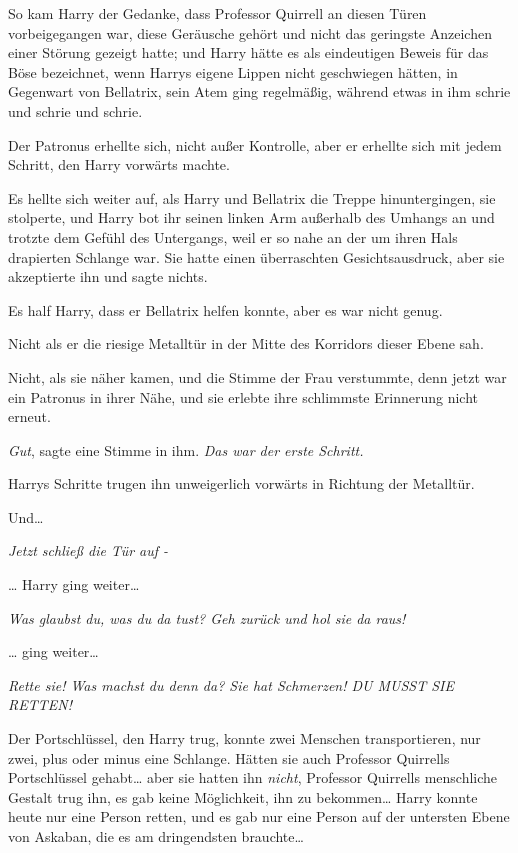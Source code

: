 {So kam Harry der Gedanke, dass Professor Quirrell an diesen Türen vorbeigegangen war, diese Geräusche gehört und nicht das geringste Anzeichen einer Störung gezeigt hatte; und Harry hätte es als eindeutigen Beweis für das Böse bezeichnet, wenn Harrys eigene Lippen nicht geschwiegen hätten, in Gegenwart von Bellatrix, sein Atem ging regelmäßig, während etwas in ihm schrie und schrie und schrie.

Der Patronus erhellte sich, nicht außer Kontrolle, aber er erhellte sich mit jedem Schritt, den Harry vorwärts machte.

Es hellte sich weiter auf, als Harry und Bellatrix die Treppe hinuntergingen, sie stolperte, und Harry bot ihr seinen linken Arm außerhalb des Umhangs an und trotzte dem Gefühl des Untergangs, weil er so nahe an der um ihren Hals drapierten Schlange war. Sie hatte einen überraschten Gesichtsausdruck, aber sie akzeptierte ihn und sagte nichts.

Es half Harry, dass er Bellatrix helfen konnte, aber es war nicht genug.

Nicht als er die riesige Metalltür in der Mitte des Korridors dieser Ebene sah.

Nicht, als sie näher kamen, und die Stimme der Frau verstummte, denn jetzt war ein Patronus in ihrer Nähe, und sie erlebte ihre schlimmste Erinnerung nicht erneut.

\emph{Gut}, sagte eine Stimme in ihm. \emph{Das war der erste Schritt.}

Harrys Schritte trugen ihn unweigerlich vorwärts in Richtung der Metalltür.

Und…

\emph{Jetzt schließ die Tür auf -}

… Harry ging weiter…

\emph{Was glaubst du, was du da tust? Geh zurück und hol sie da raus!}

… ging weiter…

\emph{Rette sie! Was machst du denn da? Sie hat Schmerzen! DU MUSST SIE RETTEN!}

Der Portschlüssel, den Harry trug, konnte zwei Menschen transportieren, nur zwei, plus oder minus eine Schlange. Hätten sie auch Professor Quirrells Portschlüssel gehabt… aber sie hatten ihn \emph{nicht}, Professor Quirrells menschliche Gestalt trug ihn, es gab keine Möglichkeit, ihn zu bekommen… Harry konnte heute nur eine Person retten, und es gab nur eine Person auf der untersten Ebene von Askaban, die es am dringendsten brauchte…

}
